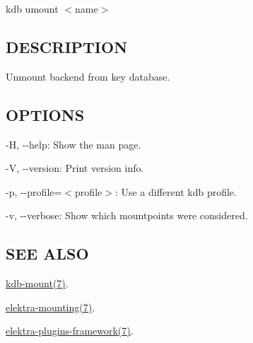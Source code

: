 {\ttfamily kdb umount $<$name$>$}

\subsection*{D\+E\+S\+C\+R\+I\+P\+T\+I\+O\+N}

Unmount backend from key database.

\subsection*{O\+P\+T\+I\+O\+N\+S}


\begin{DoxyItemize}
\item {\ttfamily -\/\+H}, {\ttfamily -\/-\/help}\+: Show the man page.
\item {\ttfamily -\/\+V}, {\ttfamily -\/-\/version}\+: Print version info.
\item {\ttfamily -\/p}, {\ttfamily -\/-\/profile}=$<$profile$>$\+: Use a different kdb profile.
\item {\ttfamily -\/v}, {\ttfamily -\/-\/verbose}\+: Show which mountpoints were considered.
\end{DoxyItemize}

\subsection*{S\+E\+E A\+L\+S\+O}


\begin{DoxyItemize}
\item \hyperlink{md_doc_help_kdb-mount_doc_help_kdb-mount_md}{kdb-\/mount(7)}.
\item \hyperlink{md_doc_help_elektra-mounting_doc_help_elektra-mounting_md}{elektra-\/mounting(7)}.
\item \hyperlink{md_doc_help_elektra-plugins-framework_doc_help_elektra-plugins-framework_md}{elektra-\/plugins-\/framework(7)}. 
\end{DoxyItemize}
